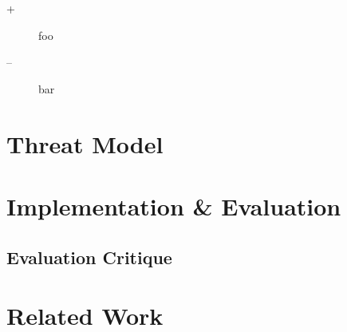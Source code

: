 \documentclass[10pt,twocolumn,letter]{article}
\begin{document}
\begin{description}
  \item[+] foo
  \item[--] bar
\end{description}

\section{Threat Model}\label{threat}

\section{Implementation \& Evaluation}\label{eval}

\subsection{Evaluation Critique}\label{eval:crit}

\section{Related Work}\label{rel}
\end{document}
